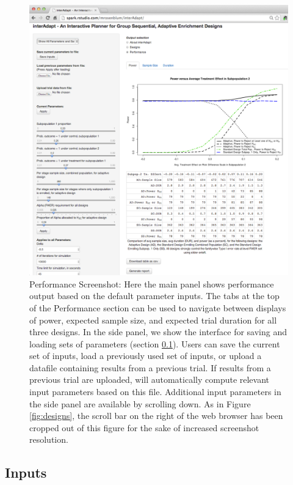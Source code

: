 \documentclass[article]{jss}
\begin{document}
\begin{figure}[h]
\centering{}\includegraphics[width=1\textwidth]{2014-02-29_screenshot_performance.png} 
\caption{Performance Screenshot: Here the main panel shows performance output based on the default parameter inputs. The tabs at the top of the Performance section can be used to navigate between displays of power, expected sample size, and expected trial duration for all three designs. In the side panel, we show the interface for saving and loading sets of parameters (section \ref{sub:inputs}). Users can save the current set of inputs, load a previously used set of inputs, or upload a datafile containing results from a previous trial. If results from a previous trial are uploaded,  will automatically compute relevant input parameters based on this file. Additional input parameters in the side panel are available by scrolling down. As in Figure \ref{fig:designs}, the scroll bar on the right of the web browser has been cropped out of this figure for the sake of increased screenshot resolution.  \label{fig:performance} }
\end{figure}


\subsection{Inputs}
\label{sub:inputs}
\end{document}

